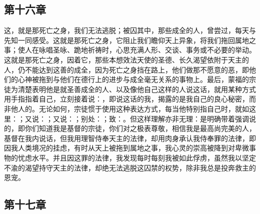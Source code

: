 
\subsection{第十六章}

\par

这，就是那死亡之身，我们无法逃脱；被囚其中，那些成全的人，曾尝过，每天与先知一同感受。这就是那死亡之身，它阻止我们瞻仰天上异象，将我们拖回属地之事；使人在咏唱圣咏、跪地祈祷时，心思充满人形、交谈、事务或不必要的举动。这就是那死亡之身，因着它，那些本想效法天使的圣德、长久渴望依附于天主的人，仍不能达到这善的成全，因为死亡之身挡在路上，他们做那不愿意的恶，即他们的心神被拖到与他们在德行上的进步与成全毫无关系的事物上。最后，蒙福的宗徒为清楚表明他是就圣善成全的人、以及像他自己这样的人说这话，就用某种方式用手指指着自己，立刻接着说：，即说这话的我，揭露的是我自己的良心秘密，而非他人的。无论如何，宗徒惯于使用这种表达方式，每当他特别指自己时，就如这里：；又说：；又说：；别处：；致：。但这样理解亦非无理：是明确带着强调说的，即你们知道我是基督的宗徒，你们对之极表尊敬，相信我是最高尚完美的人，基督在我内说话，但我用理智侍奉天主的法律，却用肉身承认我侍奉罪的法律，即因我人类境况的挂虑，有时从天上被拖到属地之事，我心灵的崇高被降到对卑微事物的忧虑水平。并且因这罪的法律，我发现每时每刻我被如此俘虏，虽然我以坚定不渝的渴望持守天主的法律，却绝无法逃脱这囚禁的权势，除非我总是投奔救主的恩宠。\par


\subsection{第十七章}

\par

